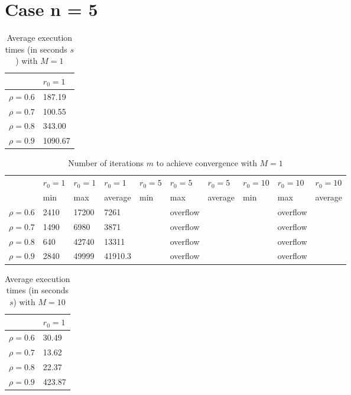\documentclass[a4paper,11pt,openright]{report}
\begin{document}
\section*{Case n = 5} 
\begin{table}[H]
\centering
\addtolength{\leftskip}{-1.5cm}
\addtolength{\rightskip}{-1.5cm}
\begin{tabular}{|c|l|}
\hline
$ $ & $r_0 = 1$ \\
\hline
$\rho = 0.6$ & 187.19 \\

$\rho = 0.7$ & 100.55 \\

$\rho = 0.8$ & 343.00 \\

$\rho = 0.9$ & 1090.67 \\
\hline
\end{tabular}
\caption{Average execution
 times (in seconds $s$) with $M = 1$}
\end{table}
\begin{table}[H]
\centering
\addtolength{\leftskip}{-1.5cm}
\addtolength{\rightskip}{-1.5cm}
\begin{tabular}{|c|lllllllll|}
\hline
$ $ & $r_0 = 1$ & $r_0 = 1$ & $r_0 = 1$ & $r_0 = 5$ & $r_0 = 5$ & $r_0 = 5$ & $r_0 = 10$ & $r_0 = 10$ & $r_0 = 10$  \\
$ $ & min & max & average & min & max & average & min & max & average \\ 
\hline
$\rho = 0.6$ & 2410 & 17200 & 7261 &  & overflow &  &  & overflow &  \\

$\rho = 0.7$ & 1490 & 6980 & 3871 &  & overflow &  &  & overflow &  \\

$\rho = 0.8$ & 640 & 42740 & 13311 &  & overflow &  &  & overflow & \\

$\rho = 0.9$ & 2840 & 49999 & 41910.3 &  & overflow &  &  & overflow & \\
\hline
\end{tabular}
\caption{Number of iterations $m$ to achieve convergence with $M = 1$}
\end{table}
\begin{table}[H]
\centering
\addtolength{\leftskip}{-1.5cm}
\addtolength{\rightskip}{-1.5cm}
\begin{tabular}{|c|l|}
\hline
$ $ & $r_0 = 1$  \\
\hline
$\rho = 0.6$ & 30.49  \\

$\rho = 0.7$ & 13.62  \\

$\rho = 0.8$ & 22.37  \\

$\rho = 0.9$ & 423.87   \\
\hline
\end{tabular}
\caption{Average execution
 times (in seconds $s$) with $M = 10$}
\end{table}
\end{document}
